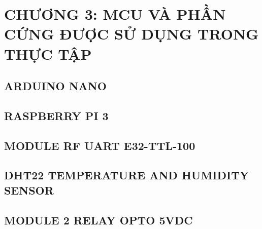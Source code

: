 \section*{CHƯƠNG 3: MCU VÀ PHẦN CỨNG ĐƯỢC SỬ DỤNG TRONG THỰC TẬP}
\setcounter{section}{3}
\setcounter{subsection}{0}
\subsection{ARDUINO NANO}
\subsection{RASPBERRY PI 3}
\subsection{MODULE RF UART E32-TTL-100}
\subsection{DHT22 TEMPERATURE AND HUMIDITY SENSOR}
\subsection{MODULE 2 RELAY OPTO 5VDC}